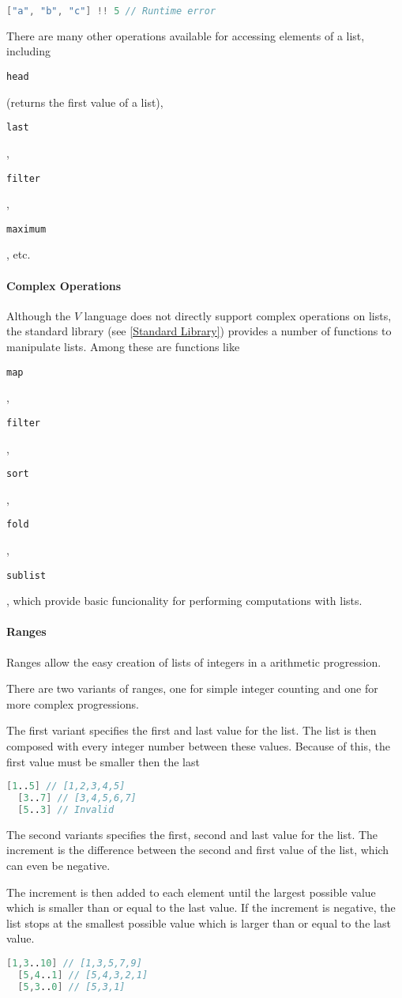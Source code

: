 \documentclass{article}
\def\code#1{\begin{footnotesize}\texttt{#1}\end{footnotesize}}
\begin{document}
\begin{lstlisting}[language=V]
  ["a", "b", "c"] !! 5 // Runtime error
\end{lstlisting}

There are many other operations available for accessing elements of a list, including \code{head} (returns the first value of a list), \code{last}, \code{filter}, \code{maximum}, etc.

\paragraph{Complex Operations}
Although the $V$ language does not directly support complex operations on lists, the standard library (see \ref{Standard Library}) provides a number of functions to manipulate lists.
Among these are functions like \code{map}, \code{filter}, \code{sort}, \code{fold}, \code{sublist}, which provide basic funcionality for performing computations with lists.

\paragraph{Ranges}
Ranges allow the easy creation of lists of integers in a arithmetic progression.

There are two variants of ranges, one for simple integer counting and one for more complex progressions.

The first variant specifies the first and last value for the list.
The list is then composed with every integer number between these values.
Because of this, the first value must be smaller then the last

\begin{lstlisting}[language=V]
  [1..5] // [1,2,3,4,5]
  [3..7] // [3,4,5,6,7]
  [5..3] // Invalid
\end{lstlisting}

The second variants specifies the first, second and last value for the list.
The increment is the difference between the second and first value of the list, which can even be negative.

The increment is then added to each element until the largest possible value which is smaller than or equal to the last value.
If the increment is negative, the list stops at the smallest possible value which is larger than or equal to the last value.

\begin{lstlisting}[language=V]
  [1,3..10] // [1,3,5,7,9]
  [5,4..1] // [5,4,3,2,1]
  [5,3..0] // [5,3,1]
\end{lstlisting}
\end{document}
